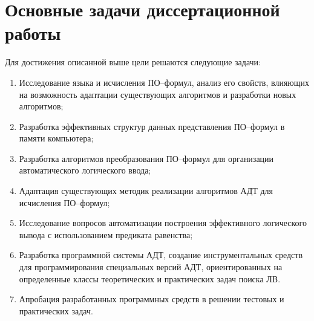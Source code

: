 \section*{Основные задачи диссертационной работы} 
Для достижения описанной выше цели решаются следующие задачи:
\begin{enumerate}
\item Исследование языка и исчисления ПО--формул, анализ его свойств, влияющих на возможность адаптации существующих алгоритмов и разработки новых алгоритмов;
\item Разработка эффективных структур данных представления ПО--формул в памяти компьютера;
\item Разработка алгоритмов преобразования ПО--формул для организации автоматического логического ввода;
\item Адаптация существующих методик реализации алгоритмов АДТ для исчисления ПО--формул;
\item Исследование вопросов автоматизации построения эффективного логического вывода с использованием предиката равенства;
\item Разработка программной системы АДТ, создание инструментальных средств для программирования специальных версий АДТ, ориентированных на определенные классы теоретических и практических задач поиска ЛВ.
\item Апробация разработанных программных средств в решении тестовых и практических задач.
\end{enumerate}


